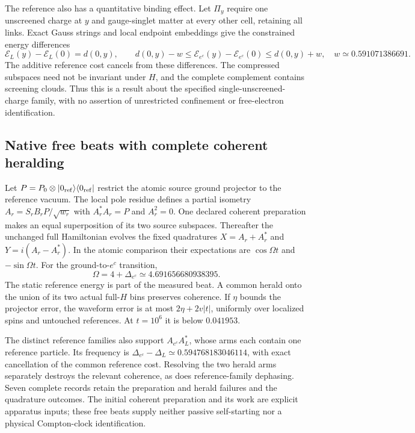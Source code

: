 The reference also has a quantitative binding effect. Let $\Pi_y$ require
one unscreened charge at $y$ and gauge-singlet matter at every other cell,
retaining all links. Exact Gauss strings and local endpoint embeddings
give the constrained energy differences
\[
 \mathcal E_L(y)-\mathcal E_L(0)=d(0,y),\qquad
 d(0,y)-w\leq\mathcal E_{e^c}(y)-\mathcal E_{e^c}(0)
          \leq d(0,y)+w,
 \quad w\simeq0.591071386691.
\]
The additive reference cost cancels from these differences. The compressed
subspaces need not be invariant under $H$, and the complete complement
contains screening clouds. Thus this is a result about the specified
single-unscreened-charge family, with no assertion of unrestricted
confinement or free-electron identification.

\subsection{Native free beats with complete coherent heralding}

Let $P=P_0\otimes|0_{\rm ref}\rangle\langle0_{\rm ref}|$ restrict the
atomic source ground projector to the reference vacuum. The local pole
residue defines a partial isometry $A_r=S_rB_rP/\sqrt{w_r}$ with
$A_r^*A_r=P$ and $A_r^2=0$.
One declared coherent preparation makes an equal superposition of its
two source subspaces. Thereafter the unchanged full Hamiltonian evolves
the fixed quadratures $X=A_r+A_r^*$ and $Y=i(A_r-A_r^*)$. In the
atomic comparison their expectations are $\cos\Omega t$ and
$-\sin\Omega t$. For the ground-to-$e^c$ transition,
\[
 \Omega=4+\Delta_{e^c}\simeq4.691656680938395.
\]
The static reference energy is part of the measured beat. A common
herald onto the union of its two actual full-$H$ bins preserves
coherence. If $\eta$ bounds the projector error, the waveform error
is at most $2\eta+2v|t|$, uniformly over localized spins and untouched
references. At $t=10^6$ it is below $0.041953$.

The distinct reference families also support
$A_{e^c}A_L^*$, whose arms each contain one reference particle.
Its frequency is
$\Delta_{e^c}-\Delta_L\simeq0.594768183046114$, with exact
cancellation of the common reference cost. Resolving the two herald
arms separately destroys the relevant coherence, as does
reference-family dephasing. Seven complete records retain the
preparation and herald failures and the quadrature outcomes. The
initial coherent preparation and its work are explicit apparatus
inputs; these free beats supply neither passive self-starting nor a
physical Compton-clock identification.

